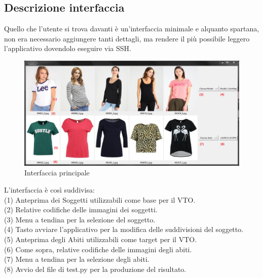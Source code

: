 \documentclass[final, 11pt]{article}
\begin{document}
	\subsection{Descrizione interfaccia}
	Quello che l’utente si trova davanti è un’interfaccia minimale e alquanto spartana, non era necessario aggiungere tanti dettagli, ma rendere il più possibile leggero l’applicativo dovendolo eseguire via SSH.
	
	\begin{figure}[!htb]
		\centering
		\includegraphics[width=\linewidth]{PyTryOn_numerata_1.png}
		\caption{Interfaccia principale}
	\end{figure} 

L’interfaccia è così suddivisa:\\
	(1) Anteprima dei Soggetti utilizzabili come base per il VTO.
\\
	(2) Relative codifiche delle immagini dei soggetti.
\\
	(3) Menu a tendina per la selezione del soggetto. 
\\
	(4) Tasto avviare l’applicativo per la modifica delle suddivisioni del soggetto. 
\\
	(5) Anteprima degli Abiti utilizzabili come target per il VTO. 
\\
	(6) Come sopra, relative codifiche delle immagini degli abiti. \\
	(7) Menu a tendina per la selezione degli abiti.
\\
	(8) Avvio del file di test.py per la produzione del risultato. 
\\
	
\end{document}
